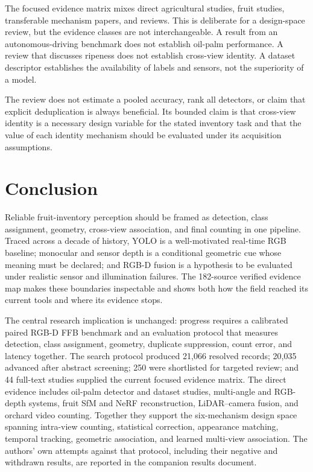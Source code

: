 The focused evidence matrix mixes direct agricultural studies, fruit studies, transferable mechanism papers, and reviews. This is deliberate for a design-space review, but the evidence classes are not interchangeable. A result from an autonomous-driving benchmark does not establish oil-palm performance. A review that discusses ripeness does not establish cross-view identity. A dataset descriptor establishes the availability of labels and sensors, not the superiority of a model.

The review does not estimate a pooled accuracy, rank all detectors, or claim that explicit deduplication is always beneficial. Its bounded claim is that cross-view identity is a necessary design variable for the stated inventory task and that the value of each identity mechanism should be evaluated under its acquisition assumptions.

\section{Conclusion}

Reliable fruit-inventory perception should be framed as detection, class assignment, geometry, cross-view association, and final counting in one pipeline. Traced across a decade of history, YOLO is a well-motivated real-time RGB baseline; monocular and sensor depth is a conditional geometric cue whose meaning must be declared; and RGB-D fusion is a hypothesis to be evaluated under realistic sensor and illumination failures. The 182-source verified evidence map makes these boundaries inspectable and shows both how the field reached its current tools and where its evidence stops.

The central research implication is unchanged: progress requires a calibrated paired RGB-D FFB benchmark and an evaluation protocol that measures detection, class assignment, geometry, duplicate suppression, count error, and latency together. The search protocol produced 21,066 resolved records; 20,035 advanced after abstract screening; 250 were shortlisted for targeted review; and 44 full-text studies supplied the current focused evidence matrix. The direct evidence includes oil-palm detector and dataset studies, multi-angle and RGB-depth systems, fruit SfM and NeRF reconstruction, LiDAR--camera fusion, and orchard video counting. Together they support the six-mechanism design space spanning intra-view counting, statistical correction, appearance matching, temporal tracking, geometric association, and learned multi-view association. The authors' own attempts against that protocol, including their negative and withdrawn results, are reported in the companion results document.

